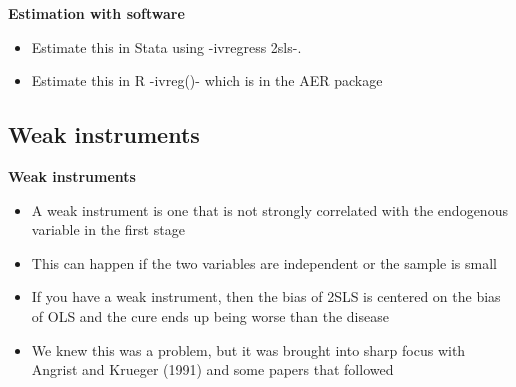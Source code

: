 \documentclass[notes=show]{beamer}
\begin{document}
\begin{frame}[plain]
\begin{center}
\textbf{Estimation with software}
\end{center}

\begin{itemize}

	\item Estimate this in Stata using -ivregress 2sls-.
	\item Estimate this in R -ivreg()- which is in the AER package

\end{itemize}

\end{frame}



\subsection{Weak instruments}

\begin{frame}
\begin{center}
\textbf{Weak instruments}
\end{center}

\begin{itemize}
\item A weak instrument is one that is not strongly correlated with the endogenous variable in the first stage
\item This can happen if the two variables are independent or the sample is small
\item If you have a weak instrument, then the bias of 2SLS is centered on the bias of OLS and the cure ends up being worse than the disease
\item We knew this was a problem, but it was brought into sharp focus with Angrist and Krueger (1991) and some papers that followed
\end{itemize}

\end{frame}
\end{document}
